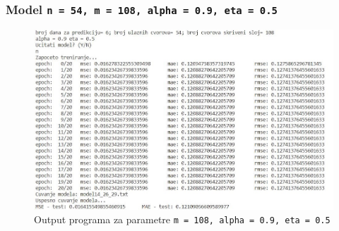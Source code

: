 \documentclass[a4paper]{article}
\begin{document}
\pagebreak %
\subsubsection{Model \texttt{n = 54, m = 108, alpha = 0.9, eta = 0.5}}
\begin{figure}[h!]
\begin{center}
\includegraphics[scale=0.9]{output/output_example_program_14_26_29.JPG}
\end{center}
\caption{Output programa za parametre \texttt{m = 108, alpha = 0.9, eta = 0.5}}
\end{figure}
\end{document}
